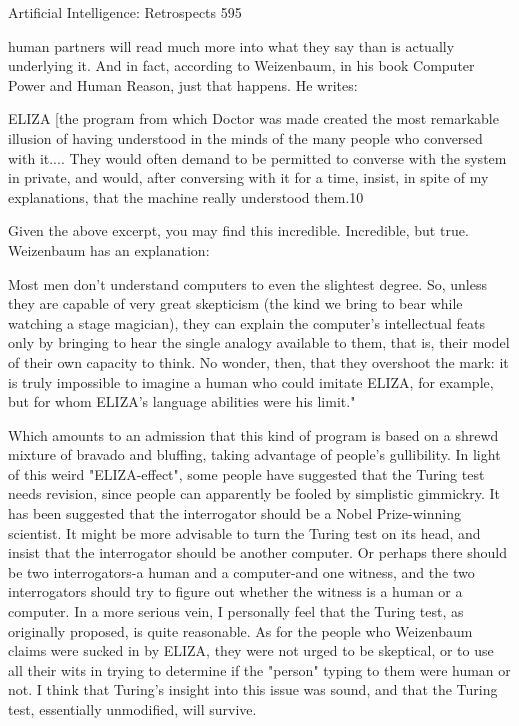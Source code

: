 {Artificial Intelligence: Retrospects                                                      595

human partners will read much more into what they say than is actually underlying it.
And in fact, according to Weizenbaum, in his book Computer Power and Human
Reason, just that happens. He writes:

   ELIZA [the program from which Doctor was made created the most remarkable
   illusion of having understood in the minds of the many people who conversed with
   it.... They would often demand to be permitted to converse with the system in
   private, and would, after conversing with it for a time, insist, in spite of my
   explanations, that the machine really understood them.10

Given the above excerpt, you may find this incredible. Incredible, but true.
Weizenbaum has an explanation:

   Most men don't understand computers to even the slightest degree. So, unless they
   are capable of very great skepticism (the kind we bring to bear while
   watching a stage magician), they can explain the computer's intellectual feats only
   by bringing to hear the single analogy available to them, that is, their
   model of their own capacity to think. No wonder, then, that they overshoot the
   mark: it is truly impossible to imagine a human who could imitate ELIZA,
   for example, but for whom ELIZA's language abilities were his limit."

Which amounts to an admission that this kind of program is based on a shrewd
mixture of bravado and bluffing, taking advantage of people's gullibility.
   In light of this weird "ELIZA-effect", some people have suggested that the Turing
test needs revision, since people can apparently be fooled by simplistic gimmickry. It
has been suggested that the interrogator should be a Nobel Prize-winning scientist. It
might be more advisable to turn the Turing test on its head, and insist that the
interrogator should be another computer. Or perhaps there should be two
interrogators-a human and a computer-and one witness, and the two interrogators
should try to figure out whether the witness is a human or a computer.
In a more serious vein, I personally feel that the Turing test, as originally proposed, is
quite reasonable. As for the people who Weizenbaum claims were sucked in by
ELIZA, they were not urged to be skeptical, or to use all their wits in trying to
determine if the "person" typing to them were human or not. I think that Turing's
insight into this issue was sound, and that the Turing test, essentially unmodified, will
survive.

}
